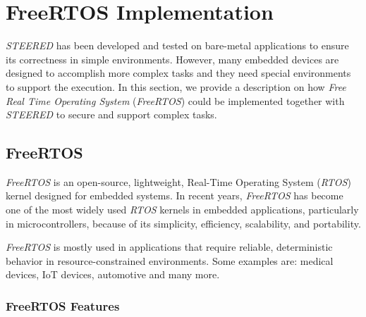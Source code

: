 \chapter{FreeRTOS Implementation}
\label{cha:rtos}

\textit{STEERED} has been developed and tested on bare-metal applications to ensure
its correctness in simple environments. However, many embedded devices are designed
to accomplish more complex tasks and they need special environments to support the
execution. In this section, we provide a description on how \textit{Free Real
Time Operating System} (\textit{FreeRTOS}) could be implemented together with \textit{STEERED}
to secure and support complex tasks.

\section{FreeRTOS}
\label{sec:rtos_rtos}

\textit{FreeRTOS}\cite{freertos} is an open-source, lightweight, Real-Time Operating
System (\textit{RTOS}) kernel designed for embedded systems. In recent years,
\textit{FreeRTOS} has become one of the most widely used \textit{RTOS} kernels
in embedded applications, particularly in microcontrollers, because of its
simplicity, efficiency, scalability, and portability.

\textit{FreeRTOS} is mostly used in applications that require reliable, deterministic
behavior in resource-constrained environments. Some examples are: medical devices,
IoT devices, automotive and many more.

\subsection{FreeRTOS Features}
\label{subsec:rtos_features}

